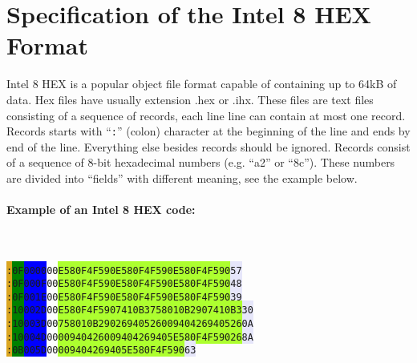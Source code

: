 \section{Specification of the Intel 8 HEX Format}
    Intel 8 HEX is a popular object file format capable of containing up to 64kB of data. Hex files have usually extension .hex or .ihx. These files are text files consisting of a sequence of records, each line line can contain at most one record. Records starts with ``\texttt{:}'' (colon) character at the beginning of the line and ends by end of the line. Everything else besides records should be ignored. Records consist of a sequence of 8-bit hexadecimal numbers (e.g. ``a2'' or ``8c''). These numbers are divided into ``fields'' with different meaning, see the example below.

    \paragraph{Example of an Intel 8 HEX code:}
        ~\\\\
        \indent\texttt{\colorbox{Goldenrod}{:}\colorbox{green}{0F}\colorbox{blue}{0000}\colorbox{Apricot}{00}\colorbox{GreenYellow}{E580F4F590E580F4F590E580F4F590}\colorbox{Lavender}{57}}\\
        \indent\texttt{\colorbox{Goldenrod}{:}\colorbox{green}{0F}\colorbox{blue}{000F}\colorbox{Apricot}{00}\colorbox{GreenYellow}{E580F4F590E580F4F590E580F4F590}\colorbox{Lavender}{48}}\\
        \indent\texttt{\colorbox{Goldenrod}{:}\colorbox{green}{0F}\colorbox{blue}{001E}\colorbox{Apricot}{00}\colorbox{GreenYellow}{E580F4F590E580F4F590E580F4F590}\colorbox{Lavender}{39}}\\
        \indent\texttt{\colorbox{Goldenrod}{:}\colorbox{green}{10}\colorbox{blue}{002D}\colorbox{Apricot}{00}\colorbox{GreenYellow}{E580F4F5907410B3758010B2907410B3}\colorbox{Lavender}{30}}\\
        \indent\texttt{\colorbox{Goldenrod}{:}\colorbox{green}{10}\colorbox{blue}{003D}\colorbox{Apricot}{00}\colorbox{GreenYellow}{758010B2902694052600940426940526}\colorbox{Lavender}{0A}}\\
        \indent\texttt{\colorbox{Goldenrod}{:}\colorbox{green}{10}\colorbox{blue}{004D}\colorbox{Apricot}{00}\colorbox{GreenYellow}{00940426009404269405E580F4F59026}\colorbox{Lavender}{8A}}\\
        \indent\texttt{\colorbox{Goldenrod}{:}\colorbox{green}{0B}\colorbox{blue}{005D}\colorbox{Apricot}{00}\colorbox{GreenYellow}{009404269405E580F4F590}\colorbox{Lavender}{63}}\\
